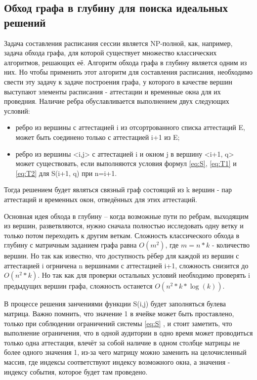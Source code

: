 \subsection{Обход графа в глубину для поиска идеальных решений}

Задача составления расписания сессии является NP-полной, как, например, задача обхода графа, для которой существует множество классических алгоритмов, решающих её. Алгоритм обхода графа в глубину \cite{dfs} является одним из них. Но чтобы применить этот алгоритм для составления расписания, необходимо свести эту задачу к задаче построения графа, у которого в качестве вершин выступают элементы расписания - аттестации и временные окна для их проведния. Наличие ребра обуславливается выполнением двух следующих условий:
\begin{itemize}
	\item ребро из вершины с аттестацией i из отсортрованного списка аттестаций E, может быть соединено только с аттестацией i+1 из E;
	\item ребро из вершины <i,j> с аттестацией i и окном j в вершину <i+1, q> может существовать, если выполняются условия формул \eqref{eq:S}, \eqref{eq:T1} и \eqref{eq:T2} для S(i+1, q) при n=i+1.
\end{itemize}

 Тогда решением будет являться связный граф состоящий из k вершин - пар аттестаций и временных окон, отведённых для этих аттестаций.

Основная идея обхода в глубину – когда возможные пути по ребрам, выходящим из вершин, разветвляются, нужно сначала полностью исследовать одну ветку и только потом переходить к другим веткам. Сложность классического обхода в глубину с матричным заданием графа равна ${O(m^2)}$, где {$m=n*k$} - количество вершин. Но так как известно, что доступность рёбер для каждой из вершин с аттестацией i огрничена n вершинами с аттестацией i+1, сложность снизится до ${O(n^2 * k)}$. Но так как для проверки остальных условий необходимо проверять i предыдущих вершин графа, сложность останется ${O(n^2 * k*\log(k))}$.

 В процессе решения занчениями функции S(i,j) будет заполняться булева матрица. Важно помнить, что значение 1 в ячейке может быть проставлено, только при соблюдении ограничений системы \eqref{eq:S} , и стоит заметить, что выполнение ограничения, что в одной аудитории в одно время может проводиться только одна аттестация, влечёт за собой наличие в одном столбце матрицы не более одного значения 1, из-за чего матрицу можно заменить на целочисленный массив, где индексы соответствуют индексу возможного окна, а значения - индексу события, которое будет там проведено.

